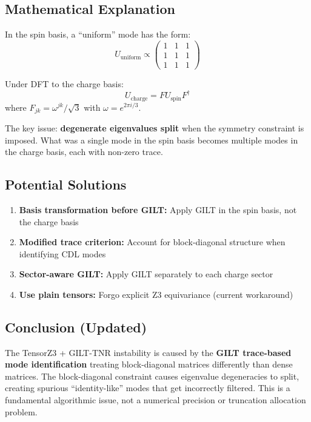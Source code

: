 \documentclass{article}
\begin{document}
\subsection{Mathematical Explanation}

In the spin basis, a ``uniform'' mode has the form:
\begin{equation}
    U_{\text{uniform}} \propto \begin{pmatrix} 1 & 1 & 1 \\ 1 & 1 & 1 \\ 1 & 1 & 1 \end{pmatrix}
\end{equation}

Under DFT to the charge basis:
\begin{equation}
    U_{\text{charge}} = F U_{\text{spin}} F^\dagger
\end{equation}
where $F_{jk} = \omega^{jk}/\sqrt{3}$ with $\omega = e^{2\pi i/3}$.

The key issue: \textbf{degenerate eigenvalues split} when the symmetry constraint is imposed. What was a single mode in the spin basis becomes multiple modes in the charge basis, each with non-zero trace.

\subsection{Potential Solutions}

\begin{enumerate}
    \item \textbf{Basis transformation before GILT:} Apply GILT in the spin basis, not the charge basis
    \item \textbf{Modified trace criterion:} Account for block-diagonal structure when identifying CDL modes
    \item \textbf{Sector-aware GILT:} Apply GILT separately to each charge sector
    \item \textbf{Use plain tensors:} Forgo explicit Z3 equivariance (current workaround)
\end{enumerate}

\subsection{Conclusion (Updated)}

The TensorZ3 + GILT-TNR instability is caused by the \textbf{GILT trace-based mode identification} treating block-diagonal matrices differently than dense matrices. The block-diagonal constraint causes eigenvalue degeneracies to split, creating spurious ``identity-like'' modes that get incorrectly filtered. This is a fundamental algorithmic issue, not a numerical precision or truncation allocation problem.
\end{document}
